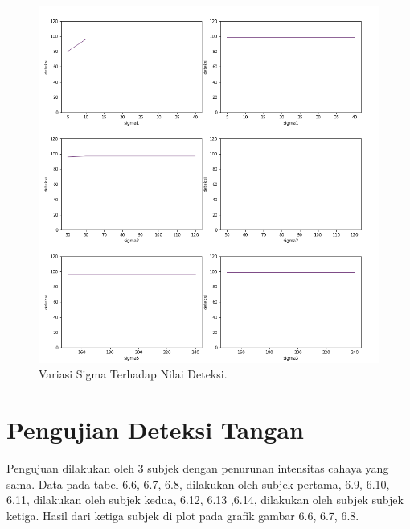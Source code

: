 \begin{figure}[H]
	\centering
	\includegraphics[width=0.8\linewidth]{dtksi}
	\caption{Variasi Sigma Terhadap Nilai Deteksi.}
	\label{fig:dtksi}
\end{figure}

\section{Pengujian Deteksi Tangan}
Pengujuan dilakukan oleh 3 subjek dengan penurunan intensitas cahaya yang sama. Data pada tabel 6.6, 6.7, 6.8, dilakukan oleh subjek pertama, 6.9, 6.10, 6.11, dilakukan oleh subjek kedua, 6.12, 6.13 ,6.14, dilakukan oleh subjek subjek ketiga. Hasil dari ketiga subjek di plot pada grafik gambar 6.6, 6.7, 6.8. 

